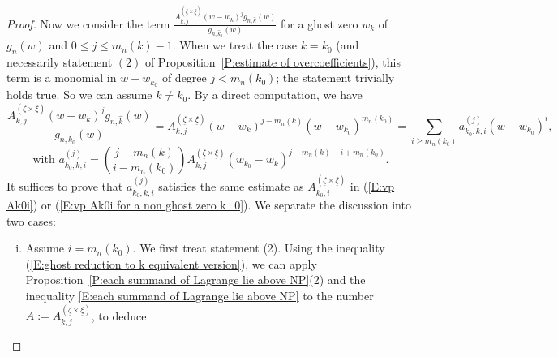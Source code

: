\documentclass[12pt]{amsart}
\theoremstyle{definition}
\numberwithin{equation}{subsection}
\newcommand{\new}{\mathrm{new}}
\newcommand{\Iw}{\mathrm{Iw}}
\begin{document}
\begin{proof}
Now we consider the term $\frac{A_{k,j}^{(\underline \zeta\times \underline \xi)}(w-w_k)^j g_{n,\hat{ k}}(w)}{g_{n,\hat{ k}_0}(w)} $ for a ghost zero $w_k$ of $g_n(w)$ and $0\leq j\leq m_n(k)-1$. When we treat the case $k=k_0$ (and necessarily statement $(2)$ of Proposition~\ref{P:estimate of overcoefficients}), this term is a monomial in $w-w_{k_0}$ of degree $j<m_n(k_0)$; the statement trivially holds true. So we can assume $k\neq k_0$. By a direct computation, we have 
	\[
	\frac{A_{k,j}^{(\underline \zeta\times \underline \xi)}(w-w_k)^j g_{n,\hat{ k}}(w)}{g_{n,\hat{ k}_0}(w)}= A_{k,j}^{(\underline \zeta\times \underline \xi)}(w-w_k)^{j-m_n(k)}(w-w_{k_0})^{m_n(k_0)}=\sum_{i\geq m_n(k_0)}a_{k_0,k,i}^{(j)} (w-w_{k_0})^i,
	\] 
	\begin{equation}
	\label{E:expression of a k_0 k i (j)}
	\text{with~}a_{k_0,k,i}^{(j)}=\binom{j-m_n(k)}{i-m_n(k_0)}A_{k,j}^{(\underline \zeta\times \underline \xi)}(w_{k_0}-w_k)^{j-m_n(k)-i+m_n(k_0)}.
	\end{equation}
	It suffices to prove that $a_{k_0,k,i}^{(j)}$ satisfies the same estimate as $A_{k_0,i}^{(\underline \zeta\times \underline \xi)}$ in (\ref{E:vp Ak0i}) or (\ref{E:vp Ak0i for a non ghost zero k_0}). We separate the discussion into two cases:
\begin{enumerate}[i)]
\item %
Assume $i=m_n(k_0)$. We first treat statement (2).		Using the inequality (\ref{E:ghost reduction to k equivalent version}), we can apply Proposition~\ref{P:each summand of Lagrange lie above NP}(2) and the inequality \eqref{E:each summand of Lagrange lie above NP} to the number $A:=A_{k,j}^{(\underline \zeta\times \underline \xi)}$, to deduce

\end{enumerate}
\end{proof}
\end{document}
